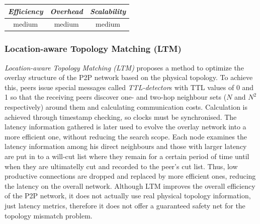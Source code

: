 
\begin{center}
\begin{tabular}{ccc}
\emph{Efficiency} & \emph{Overhead} & \emph{Scalability} \\
\hline
medium &
medium &
medium
\end{tabular}
\end{center}

\subsubsection{Location-aware Topology Matching (LTM)}
\emph{Location-aware Topology Matching (LTM)} \cite{LLXNZ2004} proposes a
method to optimize the overlay structure of the P2P network based on the
physical topology. To achieve this, peers issue special messages called
\textit{TTL-detector}s with TTL values of 0 and 1 so that the receiving peers
discover one- and two-hop neighbour sets ($N$ and $N^2$ respectively) around
them and calculating communication costs. Calculation is achieved through
timestamp checking, so clocks must be synchronised. The latency information
gathered is later used to evolve the overlay network into a more efficient one,
without reducing the search scope. Each node examines the latency information
among his direct neighbours and those with larger latency are put in to a
will-cut list where they remain for a certain period of time until when they are
ultimatelly cut and recorded to the peer's cut list. Thus, low productive
connections are dropped and replaced by more efficient ones, reducing the
latency on the overall network. Although LTM improves the overall efficiency of
the P2P network, it does not actually use real physical topology information,
just latency metrics, therefore it does not offer a guaranteed safety net for
the topology mismatch problem.

